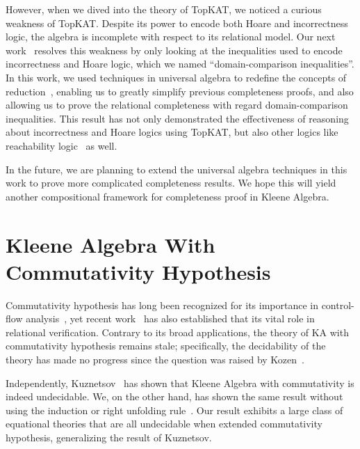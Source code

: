 \documentclass[11pt,a4paper,sans]{moderncv} %
\begin{document}
However, when we dived into the theory of TopKAT, we noticed a curious weakness of TopKAT. Despite its power to encode both Hoare and incorrectness logic, the algebra is incomplete with respect to its relational model. 
Our next work~\cite{zhang_DomainReasoningTopKAT_2024} resolves this weakness by only looking at the inequalities used to encode incorrectness and Hoare logic, which we named ``domain-comparison inequalities''. 
In this work, we used techniques in universal algebra to redefine the concepts of reduction~\cite{pous_ToolsCompletenessKleene_2021,kozen_KleeneAlgebraTests_1997c}, enabling us to greatly simplify previous completeness proofs, and also allowing us to prove the relational completeness with regard domain-comparison inequalities. 
This result has not only demonstrated the effectiveness of reasoning about incorrectness and Hoare logics using TopKAT, but also other logics like reachability logic~\cite{naus_ReachabilityLogicLowLevel_2022a} as well.

In the future, we are planning to extend the universal algebra techniques in this work to prove more complicated completeness results. We hope this will yield another compositional framework for completeness proof in Kleene Algebra.

\newpage
\section{Kleene Algebra With Commutativity Hypothesis}

Commutativity hypothesis has long been recognized for its importance in control-flow analysis~\cite{kozen_KleeneAlgebraTests_1996}, yet recent work~\cite{antonopoulos_AlgebraAlignmentRelational_2023} has also established that its vital role in relational verification. 
Contrary to its broad applications, the theory of KA with commutativity hypothesis remains stale; specifically, the decidability of the theory has made no progress since the question was raised by Kozen~\cite{kozen_KleeneAlgebraTests_1996}.

Independently, Kuznetsov~\cite{kuznetsov_ComplexityReasoningKleene_2023} has shown that Kleene Algebra with commutativity is indeed undecidable. We, on the other hand, has shown the same result without using the induction or right unfolding rule~\cite{azevedodeamorim_KleeneAlgebraCommutativity_2024}. 
Our result exhibits a large class of equational theories that are all undecidable when extended commutativity hypothesis, generalizing the result of Kuznetsov.
\end{document}

